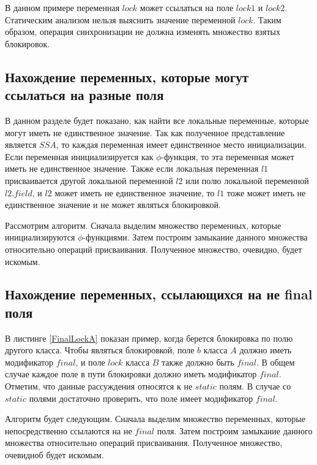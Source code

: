 

В данном примере переменная $lock$ может ссылаться на поле $lock1$ и $lock2$. Статическим анализом нельзя выяснить значение переменной $lock$. Таким образом, операция  синхронизации не должна изменять множество взятых блокировок.

\subsection{Нахождение переменных, которые могут ссылаться на разные поля}
В данном разделе будет показано, как найти все локальные переменные, которые могут иметь не единственное значение.
Так как полученное представление является $SSA$, то каждая переменная имеет единственное место инициализации. 
Если переменная инициализируется как $\phi$-функция, то эта переменная может иметь не единственное значение. Также если локальная переменная $l1$ присваивается другой локальной переменной $l2$ или полю локальной переменной $l2.field$, и $l2$ может иметь не единственное значение, то $l1$ тоже может иметь не единственное значение и не может являться блокировкой.

Рассмотрим алгоритм. Сначала выделим множество переменных, которые инициализируются $\phi$-функциями. Затем построим замыкание данного множества относительно операций присваивания. Полученное множество, очевидно, будет искомым.

\subsection{Нахождение переменных, ссылающихся на не final поля}


В листинге \ref{FinalLockA} показан пример, когда берется блокировка по полю другого класса. 
Чтобы являться блокировкой, поле $b$ класса $A$ должно иметь модификатор $final$, и поле $lock$ класса $B$ также должно быть $final$. В общем случае каждое поле в пути блокировки должно иметь модификатор $final$. Отметим, что данные рассуждения относятся к не $static$ полям. В случае со $static$ полями достаточно проверить, что поле имеет модификатор $final$.

Алгоритм будет следующим. Сначала выделим множество переменных, которые непосредственно ссылаются на не $final$ поля. Затем построим замыкание данного множества относительно операций присваивания. Полученное множество, очевидноб будет искомым.

